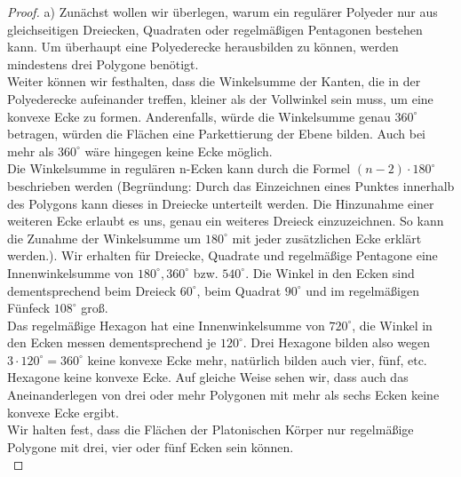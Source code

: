 \begin{proof}
a) Zunächst wollen wir überlegen, warum ein regulärer Polyeder nur aus gleichseitigen Dreiecken, Quadraten oder regelmäßigen Pentagonen bestehen kann. Um überhaupt eine Polyederecke herausbilden zu können, werden mindestens drei Polygone benötigt. \\
Weiter können wir festhalten, dass die Winkelsumme der Kanten, die in der Polyederecke aufeinander treffen, kleiner als der Vollwinkel sein muss, um eine konvexe Ecke zu formen. Anderenfalls, würde die Winkelsumme genau $360^\circ$ betragen, würden die Flächen eine Parkettierung der Ebene bilden. Auch bei mehr als $360^\circ$ wäre hingegen keine Ecke möglich.\\
Die Winkelsumme in regulären n-Ecken kann durch die Formel $(n-2)\cdot 180^\circ$ beschrieben werden (Begründung: Durch das Einzeichnen eines Punktes innerhalb des Polygons kann dieses in Dreiecke unterteilt werden. Die Hinzunahme einer weiteren Ecke erlaubt es uns, genau ein weiteres Dreieck einzuzeichnen. So kann die Zunahme der Winkelsumme um $180^\circ$ mit jeder zusätzlichen Ecke erklärt werden.). Wir erhalten für Dreiecke, Quadrate und regelmäßige Pentagone eine Innenwinkelsumme von $180^\circ, 360^\circ$ bzw. $540^\circ$. Die Winkel in den Ecken sind dementsprechend beim Dreieck $60^\circ$, beim Quadrat $90^\circ$ und im regelmäßigen Fünfeck $108^\circ$ groß. \\
Das regelmäßige Hexagon hat eine Innenwinkelsumme von $720^\circ$, die Winkel in den Ecken messen dementsprechend je $120^\circ$. Drei Hexagone bilden also wegen $3\cdot 120^\circ=360^\circ$ keine konvexe Ecke mehr, natürlich bilden auch vier, fünf, etc. Hexagone keine konvexe Ecke. Auf gleiche Weise sehen wir, dass auch das Aneinanderlegen von drei oder mehr Polygonen mit mehr als sechs Ecken keine konvexe Ecke ergibt.\\
Wir halten fest, dass die Flächen der Platonischen Körper nur regelmäßige Polygone mit drei, vier oder fünf Ecken sein können.\\


\end{proof}
